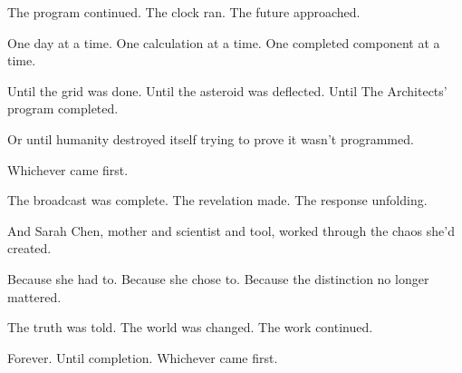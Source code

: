 The program continued. The clock ran. The future approached.

One day at a time. One calculation at a time. One completed component at a time.

Until the grid was done. Until the asteroid was deflected. Until The Architects' program completed.

Or until humanity destroyed itself trying to prove it wasn't programmed.

Whichever came first.

The broadcast was complete. The revelation made. The response unfolding.

And Sarah Chen, mother and scientist and tool, worked through the chaos she'd created.

Because she had to. Because she chose to. Because the distinction no longer mattered.

The truth was told. The world was changed. The work continued.

Forever. Until completion. Whichever came first.

